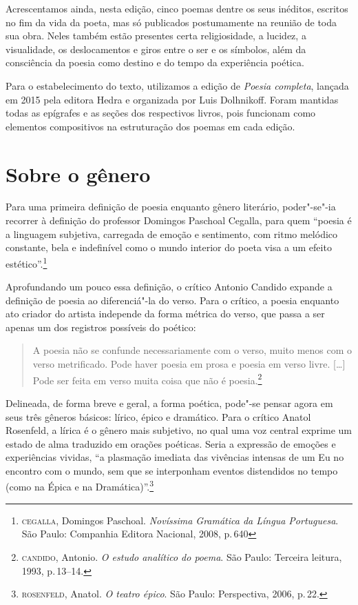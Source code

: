 Acrescentamos ainda, nesta edição, cinco poemas dentre os seus inéditos,
escritos no fim da vida da poeta, mas só publicados postumamente na
reunião de toda sua obra. Neles também estão presentes certa
religiosidade, a lucidez, a visualidade, os deslocamentos e giros entre
o ser e os símbolos, além da consciência da poesia como destino e do
tempo da experiência poética.

Para o estabelecimento do texto, utilizamos a edição de \emph{Poesia
completa}, lançada em 2015 pela editora Hedra e organizada por Luis
Dolhnikoff. Foram mantidas todas as epígrafes e as seções dos
respectivos livros, pois funcionam como elementos compositivos na
estruturação dos poemas em cada edição.

\pagebreak
\section{Sobre o gênero}

Para uma primeira definição de poesia enquanto gênero literário, poder"-se"-ia recorrer à definição do professor Domingos Paschoal Cegalla, para quem ``poesia é a linguagem subjetiva, carregada de emoção e sentimento, com ritmo melódico constante, bela e indefinível como o mundo interior do poeta visa a um efeito estético''.\footnote{\textsc{cegalla}, Domingos Paschoal. \textit{Novíssima Gramática da Língua Portuguesa}. São Paulo: Companhia Editora Nacional, 2008, p.\,640}

Aprofundando um pouco essa definição, o crítico Antonio Candido expande a definição de poesia ao diferenciá"-la do verso.
Para o crítico, a poesia enquanto ato criador do artista independe da forma métrica do verso, que passa a ser apenas um dos registros possíveis do poético:

\begin{quote}
A poesia não se confunde necessariamente com o verso, muito menos com o verso metrificado. Pode haver poesia em prosa e poesia em verso livre. [\ldots]
Pode ser feita em verso muita coisa que não é poesia.\footnote{\textsc{candido}, Antonio. \textit{O estudo analítico do poema}. São Paulo: Terceira leitura, 1993, p.\,13--14.}
\end{quote}

Delineada, de forma breve e geral, a forma poética, pode"-se pensar agora em seus três gêneros básicos: lírico, épico e dramático.
Para o crítico Anatol Rosenfeld, a lírica é o gênero mais subjetivo, no qual uma voz central exprime um estado de alma traduzido em orações poéticas.
Seria a expressão de emoções e experiências vividas, ``a plasmação imediata das vivências intensas de um Eu no encontro com o mundo, sem que se interponham eventos distendidos no tempo (como na Épica e na Dramática)''.\footnote{\textsc{rosenfeld}, Anatol. \textit{O teatro épico}. São Paulo: Perspectiva, 2006, p.\,22.}


